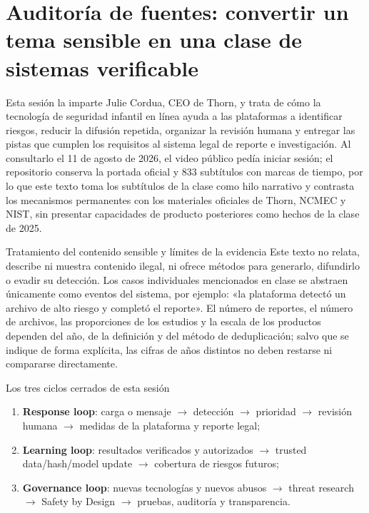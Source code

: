 \documentclass[a4paper]{article}
\begin{document}
\makecscover

\section{Auditoría de fuentes: convertir un tema sensible en una clase de sistemas verificable}

Esta sesión la imparte Julie Cordua, CEO de Thorn, y trata de cómo la tecnología de seguridad infantil en línea ayuda a las plataformas a identificar riesgos, reducir la difusión repetida, organizar la revisión humana y entregar las pistas que cumplen los requisitos al sistema legal de reporte e investigación. Al consultarlo el 11 de agosto de 2026, el video público pedía iniciar sesión; el repositorio conserva la portada oficial y 833 subtítulos con marcas de tiempo, por lo que este texto toma los subtítulos de la clase como hilo narrativo y contrasta los mecanismos permanentes con los materiales oficiales de Thorn, NCMEC y NIST, sin presentar capacidades de producto posteriores como hechos de la clase de 2025.

\begin{warningbox}{Tratamiento del contenido sensible y límites de la evidencia}
Este texto no relata, describe ni muestra contenido ilegal, ni ofrece métodos para generarlo, difundirlo o evadir su detección. Los casos individuales mencionados en clase se abstraen únicamente como eventos del sistema, por ejemplo: «la plataforma detectó un archivo de alto riesgo y completó el reporte». El número de reportes, el número de archivos, las proporciones de los estudios y la escala de los productos dependen del año, de la definición y del método de deduplicación; salvo que se indique de forma explícita, las cifras de años distintos no deben restarse ni compararse directamente.
\end{warningbox}

\begin{importantbox}{Los tres ciclos cerrados de esta sesión}
\begin{enumerate}
  \item \textbf{Response loop}: carga o mensaje $\rightarrow$ detección $\rightarrow$ prioridad $\rightarrow$ revisión humana $\rightarrow$ medidas de la plataforma y reporte legal;
  \item \textbf{Learning loop}: resultados verificados y autorizados $\rightarrow$ trusted data/hash/model update $\rightarrow$ cobertura de riesgos futuros;
  \item \textbf{Governance loop}: nuevas tecnologías y nuevos abusos $\rightarrow$ threat research $\rightarrow$ Safety by Design $\rightarrow$ pruebas, auditoría y transparencia.
\end{enumerate}
\end{importantbox}
\end{document}
